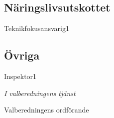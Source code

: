 \documentclass[../_main/handlingar.tex]{subfiles}
\begin{document}

\subsection*{Näringslivsutskottet}
\begin{vallista}
    \begin{post}{Teknikfokusansvarig}{1}
        \vakant
    \end{post}
\end{vallista}

\subsection*{Övriga}
\begin{vallista}
    \begin{post}{Inspektor}{1}
    \end{post}
\end{vallista}

\begin{signatures}{1}
\emph{I valberedningens tjänst}
\signature{Christian Benson}{Valberedningens ordförande}
\end{signatures}
\end{document}
